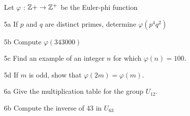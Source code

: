 
\begin{question}{5}
Let $\varphi$ : $\mathbb{Z}+ \rightarrow \mathbb{Z}^+$ be the Euler-phi function
\end{question}


\begin{question}{5a}
If $p$ and $q$ are distinct primes, determine $\varphi(p^4q^2)$
\end{question}

\begin{question}{5b}
Compute $\varphi(343000)$
\end{question}

\begin{question}{5c}
Find an example of an integer $n$ for which $\varphi(n) = 100$.
\end{question}

\begin{question}{5d}
If $m$ is odd, show that $\varphi(2m) = \varphi(m).$
\end{question}






\begin{question}{6a}
Give the multiplication table for the group $U_{12}$.
\end{question}

\begin{question}{6b}
Compute the inverse of 43 in $U_{63}$
\end{question}




